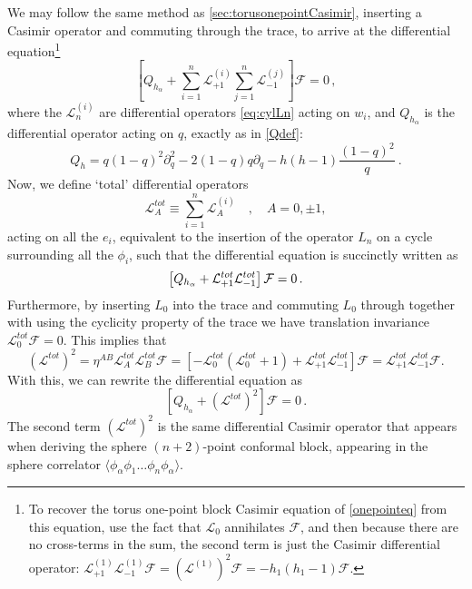 \documentclass[12pt]{article}
\newcommand{\calL}{\mathcal{L}}
\begin{document}
We may follow the same method as \cref{sec:torusonepointCasimir}, inserting a Casimir operator and commuting through the trace,  to arrive at the differential equation\footnote{To recover the torus one-point block Casimir equation of \cref{onepointeq} from this equation, use the fact that $\mathcal{L}_0$ annihilates $\mathcal{F}$, and then because there are no cross-terms in the sum, the second term is just the Casimir differential operator: $\mathcal{L}_{+1}^{(1)} \mathcal{L}_{-1}^{(1)}\mathcal{F} = (\mathcal{L}^{(1)})^2 \mathcal{F} = -h_1(h_1-1) \mathcal{F}$.}
\begin{equation}
\left[Q_{h_\alpha}
+\sum_{i=1}^n \calL_{+1}^{(i)} \sum_{j=1}^n \calL_{-1}^{(j)} \right] \mathcal{F}
=0 \,,
\end{equation}
where the $\mathcal{L}_n^{(i)}$ are differential operators \cref{eq:cylLn} acting on $w_i$, and $Q_{h_\alpha}$ is the differential operator acting on $q$, exactly as in \cref{Qdef}:
\begin{equation}
Q_{h} =
q(1-q)^2 \partial_q^2
-2(1-q)q \partial_q
-h(h-1)\frac{(1-q)^2}{q}~.
\end{equation}
Now, we define `total' differential operators
\begin{equation}
\calL^{tot}_{A}\equiv \sum_{i=1}^n \calL_{A}^{(i)}\quad , \quad A=0,\pm1,
\end{equation}
acting on all the $e_i$, equivalent to the insertion of the operator $L_n$ on a cycle surrounding all the $\phi_i$, such that the differential equation is succinctly written as
\begin{equation}\label{eq:npointblockDiffEq0}
\left[
Q_{h_\alpha}
+\calL^{tot}_{+1}\calL^{tot}_{-1}
\right]{ \cal F}
=0\,.
\end{equation} Furthermore, by inserting $L_0$ into the trace and commuting $L_0$ through together with using the cyclicity property of the trace we have translation invariance $\calL_0^{tot} \mathcal{F} =0$. This implies that
\begin{equation}
\left(\calL^{tot}\right)^2 = \eta^{AB} \calL_A^{tot} \calL_B^{tot} \mathcal{F}
=
\left[
-\calL^{tot}_0 (\calL^{tot}_0+1)
+\calL_{+1}^{tot} \calL_{-1}^{tot}
\right]
\mathcal{F}
= \calL^{tot}_{+1} \calL^{tot}_{-1} \mathcal{F}.
\end{equation}  With this, we can rewrite the differential equation as
\begin{equation}\label{eq:npointblockDiffEq}
\left[
Q_{h_\alpha}
+\left(\calL^{tot}\right)^2
\right]\mathcal{F}
=0\,.
\end{equation}
The second term $\left(\calL^{tot}\right)^2$ is the same differential Casimir operator that appears when deriving the sphere $(n+2)$-point conformal block\cite{Dolan:2000ut}, appearing in the sphere correlator $\langle \phi_\alpha \phi_1\ldots \phi_n \phi_\alpha\rangle$.
\end{document}

